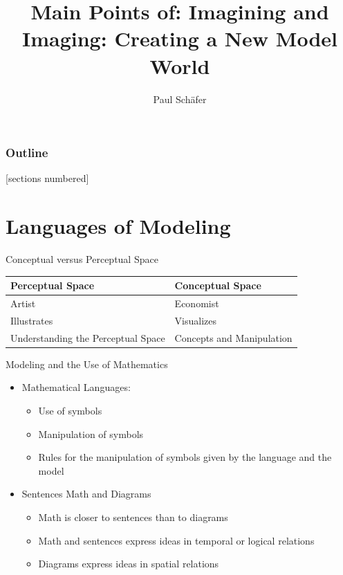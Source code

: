 \documentclass[ucs]{beamer}\usepackage[]{graphicx}\usepackage[]{color}
\begin{document}
\title{Main Points of: Imagining and Imaging: Creating
a New Model World}
\subtitle{\footnotesize{Paul Sch\"afer}}
 



\begin{frame}
\titlepage
\end{frame}

\begin{frame}
\frametitle{Outline}
[sections numbered]
  \tableofcontents
\end{frame}

\section{Languages of Modeling}
\begin{frame}{Conceptual versus Perceptual Space}
\begin{table}
\begin{center}
\begin{tabular}{|l|l|}
\hline
\textbf{Perceptual Space }& \textbf{Conceptual Space}\\ \hline
Artist & Economist \\ \hline
Illustrates & Visualizes \\ \hline
Understanding the Perceptual Space & Concepts and Manipulation\\ \hline

\end{tabular}
\end{center}
\end{table}
\end{frame}


\begin{frame}{Modeling and the Use of Mathematics}
	\begin{itemize}
		\item Mathematical Languages:
	  		\begin{itemize}
	  		\item Use of symbols
	  		\item Manipulation of symbols
	  		\item Rules for the manipulation of symbols given by the language and the model
	  		\end{itemize}
	 \item Sentences Math and Diagrams
	 	\begin{itemize}
	 		\item Math is closer to sentences than to diagrams
	 		\item Math and sentences express ideas in temporal or logical relations
	 		\item Diagrams express ideas in spatial relations
	 	\end{itemize}
	\end{itemize}
\end{frame}
\end{document}
